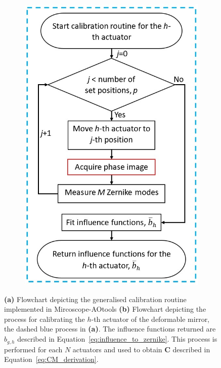 \begin{figure}[h]
\begin{subfigure}{0.45\textwidth}
		\includegraphics[width=1\linewidth, scale=0.5]{images/Ith_actuator_calibration_workflow_blue_border.jpg}
		\caption{}
		\label{fig:Ith_actuator_calibration_workflow_blue_border}
	\end{subfigure}
	\caption[Calibration routine workflow]{\textbf{(a)} Flowchart depicting the generalised calibration routine implemented in Mircoscope-AOtools \textbf{(b)} Flowchart depicting the process for calibrating the $h$-th actuator of the deformable mirror, the dashed blue process in \textbf{(a)}. The influence functions returned are $b_{g,h}$ described in Equation~\ref{eq:influence_to_zernike}. This process is performed for each $N$ actuators and used to obtain $\boldsymbol{C}$ described in Equation~\ref{eq:CM_derivation}.}
	\label{fig:calibration_workflow}
\end{figure}

